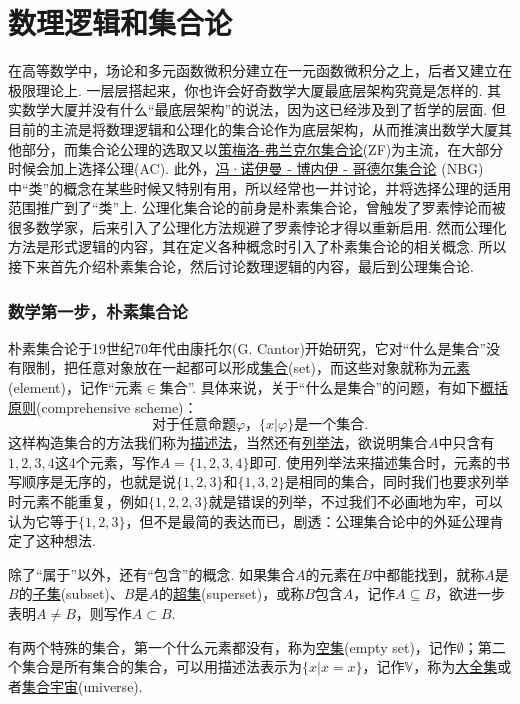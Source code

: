 \documentclass[main.tex]{subfiles}
\begin{document}
\part{数理逻辑和集合论}

在高等数学中，场论和多元函数微积分建立在一元函数微积分之上，后者又建立在极限理论上. 一层层搭起来，你也许会好奇数学大厦最底层架构究竟是怎样的. 其实数学大厦并没有什么“最底层架构”的说法，因为这已经涉及到了哲学的层面. 但目前的主流是将数理逻辑和公理化的集合论作为底层架构，从而推演出数学大厦其他部分，而集合论公理的选取又以\uline{策梅洛-弗兰克尔集合论}(ZF)为主流，在大部分时候会加上选择公理(AC). 此外，\uline{冯·诺伊曼 - 博内伊 - 哥德尔集合论} (NBG)中“类”的概念在某些时候又特别有用，所以经常也一并讨论，并将选择公理的适用范围推广到了“类”上. 公理化集合论的前身是朴素集合论，曾触发了罗素悖论而被很多数学家，后来引入了公理化方法规避了罗素悖论才得以重新启用. 然而公理化方法是形式逻辑的内容，其在定义各种概念时引入了朴素集合论的相关概念. 所以接下来首先介绍朴素集合论，然后讨论数理逻辑的内容，最后到公理集合论.

\section{数学第一步，朴素集合论}

朴素集合论于19世纪70年代由康托尔(G. Cantor)开始研究，它对“什么是集合”没有限制，把任意对象放在一起都可以形成\uline{集合}(set)，而这些对象就称为\uline{元素}(element)，记作“元素\(\in\)集合”. 具体来说，关于“什么是集合”的问题，有如下\uline{概括原则}(comprehensive scheme)：
\[\mbox{对于任意命题}\varphi\mbox{，}\{x|\varphi\}\mbox{是一个集合.}\]
这样构造集合的方法我们称为\uline{描述法}，当然还有\uline{列举法}，欲说明集合\(A\)中只含有\(1,2,3,4\)这4个元素，写作\(A=\{1,2,3,4\}\)即可. 使用列举法来描述集合时，元素的书写顺序是无序的，也就是说\(\{1,2,3\}\)和\(\{1,3,2\}\)是相同的集合，同时我们也要求列举时元素不能重复，例如\(\{1,2,2,3\}\)就是错误的列举，不过我们不必画地为牢，可以认为它等于\(\{1,2,3\}\)，但不是最简的表达而已，剧透：公理集合论中的外延公理肯定了这种想法.

除了“属于”以外，还有“包含”的概念. 如果集合\(A\)的元素在\(B\)中都能找到，就称\(A\)是\(B\)的\uline{子集}(subset)、\(B\)是\(A\)的\uline{超集}(superset)，或称\(B\)包含\(A\)，记作\(A \subseteq B\)，欲进一步表明\(A \neq B\)，则写作\(A \subset B\).

有两个特殊的集合，第一个什么元素都没有，称为\uline{空集}(empty set)，记作\(\emptyset\)；第二个集合是所有集合的集合，可以用描述法表示为\(\{x|x=x\}\)，记作\(\mathbb{V}\)，称为\uline{大全集}或者\uline{集合宇宙}(universe).
\end{document}

